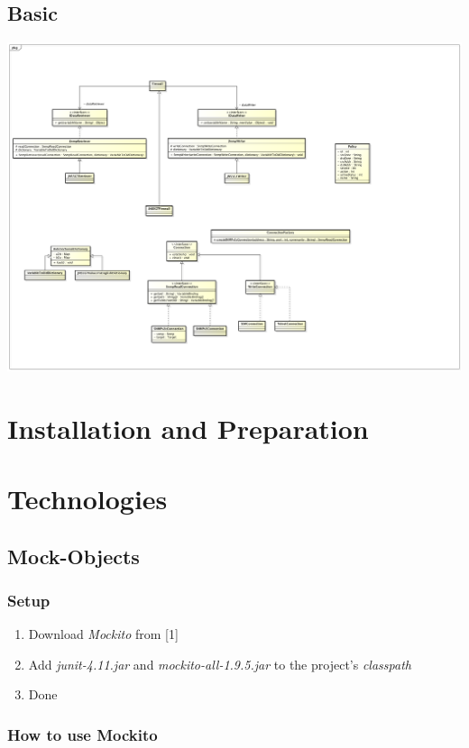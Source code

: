 \documentclass[11pt, a4paper]{article}
\begin{document}
\subsection{Basic}
\includegraphics[width=\textwidth]{images/uml}

\section{Installation and Preparation}

\section{Technologies}
\subsection{Mock-Objects}
\subsubsection{Setup}

\begin{enumerate}
	\item Download \textit{Mockito} from [1]
	\item Add \textit{junit-4.11.jar} and \textit{mockito-all-1.9.5.jar} to the project's \textit{classpath}
	\item Done
\end{enumerate}

\subsubsection{How to use Mockito}
\end{document}

